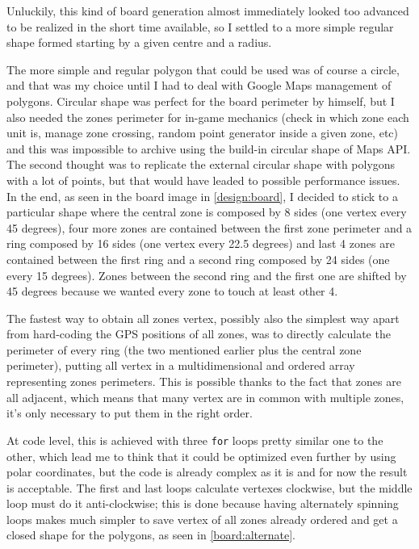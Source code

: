 			Unluckily, this kind of board generation almost immediately looked too advanced to be realized in the short time available, so I settled to a more simple regular shape formed starting by a given centre and a radius.
			
			The more simple and regular polygon that could be used was of course a circle, and that was my choice until I had to deal with Google Maps management of polygons. Circular shape was perfect for the board perimeter by himself, but I also needed the zones perimeter for in-game mechanics (check in which zone each unit is, manage zone crossing, random point generator inside a given zone, etc) and this was impossible to archive using the build-in circular shape of Maps API.
			The second thought was to replicate the external circular shape with polygons with a lot of points, but that would have leaded to possible performance issues.
			In the end, as seen in the board image in \autoref{design:board}, I decided to stick to a particular shape where the central zone is composed by 8 sides (one vertex every 45 degrees), four more zones are contained between the first zone perimeter and a ring composed by 16 sides (one vertex every 22.5 degrees) and last 4 zones are contained between the first ring and a second ring composed by 24 sides (one every 15 degrees).
			Zones between the second ring and the first one are shifted by 45 degrees because we wanted every zone to touch at least other 4.
			
			The fastest way to obtain all zones vertex, possibly also the simplest way apart from hard-coding the GPS positions of all zones, was to directly calculate the perimeter of every ring (the two mentioned earlier plus the central zone perimeter), putting all vertex in a multidimensional and ordered array representing zones perimeters.
			This is possible thanks to the fact that zones are all adjacent, which means that many vertex are in common with multiple zones, it's only necessary to put them in the right order.
			
			At code level, this is achieved with three \lstinline|for| loops pretty similar one to the other, which lead me to think that it could be optimized even further by using polar coordinates, but the code is already complex as it is and for now the result is acceptable.
			The first and last loops calculate vertexes clockwise, but the middle loop must do it anti-clockwise; this is done because having alternately spinning loops makes much simpler to save vertex of all zones already ordered and get a closed shape for the polygons, as seen in \autoref{board:alternate}.
			
